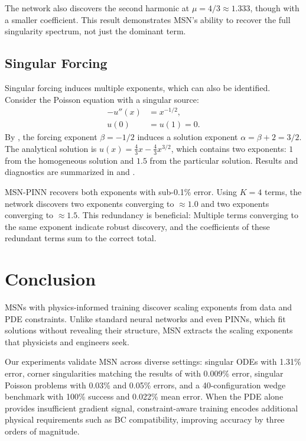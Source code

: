 \documentclass{article}
\theoremstyle{plain}
\theoremstyle{definition}
\theoremstyle{remark}
\begin{document}
The network also discovers the second harmonic at $\mu = 4/3 \approx 1.333$, though with a smaller coefficient. This result demonstrates MSN's ability to recover the full singularity spectrum, not just the dominant term.

\subsection{Singular Forcing}
\label{sec:exp5}

Singular forcing induces multiple exponents, which can also be identified. Consider the Poisson equation with a singular source:
\begin{equation}
	\begin{aligned}
		-u''(x) & = x^{-1/2}, \\
		u(0)    & = u(1) = 0.
	\end{aligned}
\end{equation}
By , the forcing exponent $\beta = -1/2$ induces a solution exponent $\alpha = \beta + 2 = 3/2$. The analytical solution is $u(x) = \frac{4}{3}x - \frac{4}{3}x^{3/2}$, which contains two exponents: $1$ from the homogeneous solution and $1.5$ from the particular solution. Results and diagnostics are summarized in  and .

MSN-PINN recovers both exponents with sub-0.1\% error. Using $K=4$ terms, the network discovers two exponents converging to $\approx 1.0$ and two exponents converging to $\approx 1.5$. This redundancy is beneficial: Multiple terms converging to the same exponent indicate robust discovery, and the coefficients of these redundant terms sum to the correct total.

\section{Conclusion}
\label{sec:conclusion}

MSNs with physics-informed training discover scaling exponents from data and PDE constraints. Unlike standard neural networks and even PINNs, which fit solutions without revealing their structure, MSN extracts the scaling exponents that physicists and engineers seek.

Our experiments validate MSN across diverse settings: singular ODEs with 1.31\% error, corner singularities matching the results of \citet{kondrat1967boundary} with 0.009\% error, singular Poisson problems with 0.03\% and 0.05\% errors, and a 40-configuration wedge benchmark with 100\% success and 0.022\% mean error. When the PDE alone provides insufficient gradient signal, constraint-aware training encodes additional physical requirements such as BC compatibility, improving accuracy by three orders of magnitude.
\end{document}

